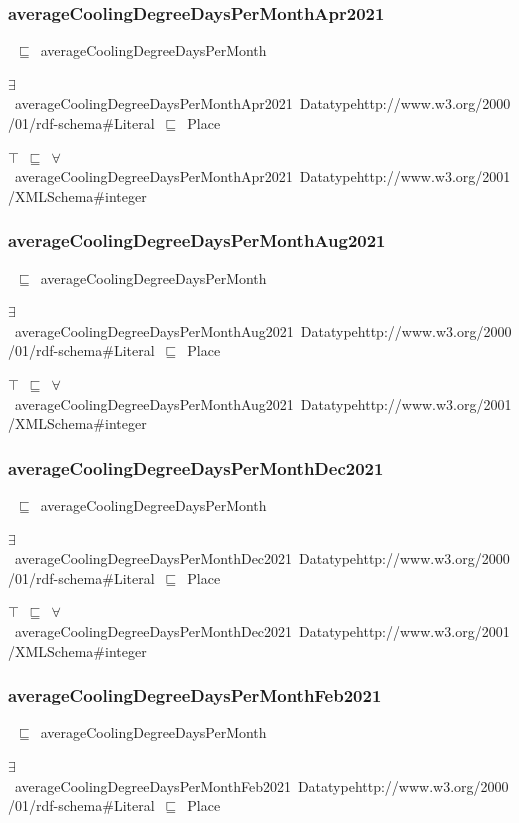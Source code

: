 \documentclass{article}
\begin{document}
\subsubsection*{averageCoolingDegreeDaysPerMonthApr2021}

~\ensuremath{\sqsubseteq}~averageCoolingDegreeDaysPerMonth

\ensuremath{\exists}~averageCoolingDegreeDaysPerMonthApr2021~Datatypehttp://www.w3.org/2000/01/rdf-schema#Literal~\ensuremath{\sqsubseteq}~Place

\ensuremath{\top}~\ensuremath{\sqsubseteq}~\ensuremath{\forall}~averageCoolingDegreeDaysPerMonthApr2021~Datatypehttp://www.w3.org/2001/XMLSchema#integer

\subsubsection*{averageCoolingDegreeDaysPerMonthAug2021}

~\ensuremath{\sqsubseteq}~averageCoolingDegreeDaysPerMonth

\ensuremath{\exists}~averageCoolingDegreeDaysPerMonthAug2021~Datatypehttp://www.w3.org/2000/01/rdf-schema#Literal~\ensuremath{\sqsubseteq}~Place

\ensuremath{\top}~\ensuremath{\sqsubseteq}~\ensuremath{\forall}~averageCoolingDegreeDaysPerMonthAug2021~Datatypehttp://www.w3.org/2001/XMLSchema#integer

\subsubsection*{averageCoolingDegreeDaysPerMonthDec2021}

~\ensuremath{\sqsubseteq}~averageCoolingDegreeDaysPerMonth

\ensuremath{\exists}~averageCoolingDegreeDaysPerMonthDec2021~Datatypehttp://www.w3.org/2000/01/rdf-schema#Literal~\ensuremath{\sqsubseteq}~Place

\ensuremath{\top}~\ensuremath{\sqsubseteq}~\ensuremath{\forall}~averageCoolingDegreeDaysPerMonthDec2021~Datatypehttp://www.w3.org/2001/XMLSchema#integer

\subsubsection*{averageCoolingDegreeDaysPerMonthFeb2021}

~\ensuremath{\sqsubseteq}~averageCoolingDegreeDaysPerMonth

\ensuremath{\exists}~averageCoolingDegreeDaysPerMonthFeb2021~Datatypehttp://www.w3.org/2000/01/rdf-schema#Literal~\ensuremath{\sqsubseteq}~Place
\end{document}
